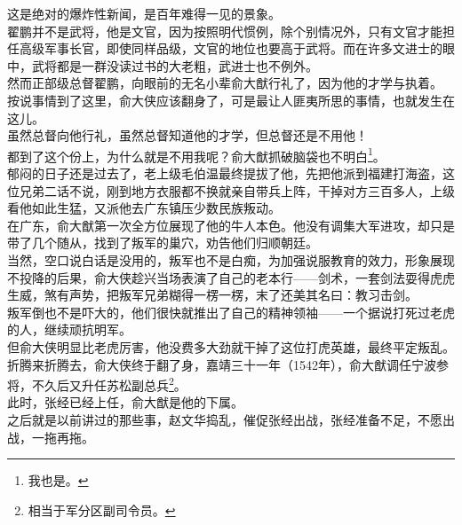 \begin{multicols}{\theparacolNo}
这是绝对的爆炸性新闻，是百年难得一见的景象。\\

翟鹏并不是武将，他是文官，因为按照明代惯例，除个别情况外，只有文官才能担任高级军事长官，即使同样品级，文官的地位也要高于武将。而在许多文进士的眼中，武将都是一群没读过书的大老粗，武进士也不例外。\\

然而正部级总督翟鹏，向眼前的无名小辈俞大猷行礼了，因为他的才学与执着。\\

按说事情到了这里，俞大侠应该翻身了，可是最让人匪夷所思的事情，也就发生在这儿。\\

虽然总督向他行礼，虽然总督知道他的才学，但总督还是不用他！\\

都到了这个份上，为什么就是不用我呢？俞大猷抓破脑袋也不明白\footnote{我也是。}。\\

郁闷的日子还是过去了，老上级毛伯温最终提拔了他，先把他派到福建打海盗，这位兄弟二话不说，刚到地方衣服都不换就亲自带兵上阵，干掉对方三百多人，上级看他如此生猛，又派他去广东镇压少数民族叛动。\\

在广东，俞大猷第一次全方位展现了他的牛人本色。他没有调集大军进攻，却只是带了几个随从，找到了叛军的巢穴，劝告他们归顺朝廷。\\

当然，空口说白话是没用的，叛军也不是白痴，为加强说服教育的效力，形象展现不投降的后果，俞大侠趁兴当场表演了自己的老本行——剑术，一套剑法耍得虎虎生威，煞有声势，把叛军兄弟糊得一楞一楞，末了还美其名曰：教习击剑。\\

叛军倒也不是吓大的，他们很快就推出了自己的精神领袖——一个据说打死过老虎的人，继续顽抗明军。\\

但俞大侠明显比老虎厉害，他没费多大劲就干掉了这位打虎英雄，最终平定叛乱。\\

折腾来折腾去，俞大侠终于翻了身，嘉靖三十一年（1542年），俞大猷调任宁波参将，不久后又升任苏松副总兵\footnote{相当于军分区副司令员。}。\\

此时，张经已经上任，俞大猷是他的下属。\\

之后就是以前讲过的那些事，赵文华捣乱，催促张经出战，张经准备不足，不愿出战，一拖再拖。\\


\end{multicols}
